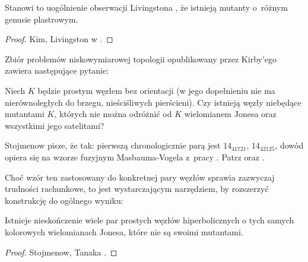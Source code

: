 Stanowi to uogólnienie obserwacji Livingstona \cite{livingston1983}, że istnieją mutanty o~różnym genusie plastrowym.
%

\begin{proof}
    Kim, Livingston w \cite{kim2005}.
\end{proof}

Zbiór problemów niskowymiarowej topologii opublikowany przez Kirby'ego \cite{kirby1978} zawiera następujące pytanie:
%

\begin{conjecture}[problem 1.91]
    Niech $K$ będzie prostym węzłem bez orientacji (w jego dopełnieniu nie ma nierównoległych do brzegu, nieściśliwych pierścieni).
%
    Czy istnieją węzły niebędące mutantami $K$, których nie można odróżnić od $K$ wielomianem Jonesa oraz wszystkimi jego satelitami?
\end{conjecture}

Stojmenow pisze, że tak: pierwszą chronologicznie parą jest $14_{41721}$, $14_{42125}$, dowód opiera się na wzorze fuzyjnym Masbauma-Vogela z~pracy \cite{masbaum1994}.
%
%
%
Patrz \cite[przykład 3.3]{tanaka2009} oraz \cite[przykład 3.2]{stoimenow2010}.

Choć wzór ten zastosowany do konkretnej pary węzłów sprawia zazwyczaj trudności rachunkowe, to jest wystarczającym narzędziem, by rozszerzyć konstrukcję do ogólnego wyniku:

\begin{proposition}
    Istnieje nieskończenie wiele par prostych węzłów hiperbolicznych o tych samych kolorowych wielomianach Jonesa, które nie są swoimi mutantami.
\end{proposition}

\begin{proof}
    Stojmenow, Tanaka \cite[tw. 1.1]{tanaka2009}.
\end{proof}


